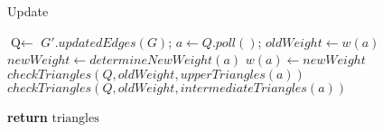 \begin{algorithm}
    \caption{Update}
    \begin{algorithmic}[1]
    
    \State $\text{Q} \gets$ $G'.updatedEdges(G)$; 
        \State $a \gets Q.poll()$; 
        \State $oldWeight \gets w(a)$
        \State $newWeight \gets determineNewWeight(a)$
            \State $w(a) \gets newWeight$
            \State $checkTriangles(Q, oldWeight, upperTriangles(a))$
            \State $checkTriangles(Q, oldWeight, intermediateTriangles(a))$
        \EndIf
    \EndWhile
    \EndProcedure

        \EndIf
    \EndFor
    \State \textbf{return} $\text{triangles}$
    \EndProcedure
        
    \end{algorithmic}
\end{algorithm}